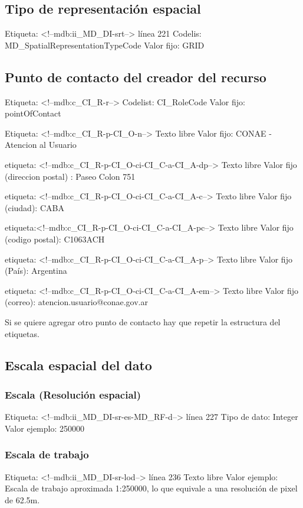 \documentclass{GVT_CONAE_Class}
\begin{document}
\subsection{Tipo de representación espacial}
Etiqueta: <!--mdb:ii\_MD\_DI-srt--> línea 221
Codelis: MD\_SpatialRepresentationTypeCode
Valor fijo: GRID

\subsection{Punto de contacto del creador del recurso}
Etiqueta: <!--mdb:c\_CI\_R-r-->
Codelist: CI\_RoleCode
Valor fijo: pointOfContact

Etiqueta: <!--mdb:c\_CI\_R-p-CI\_O-n-->
Texto libre
Valor fijo: CONAE - Atencion al Usuario

etiqueta: <!--mdb:c\_CI\_R-p-CI\_O-ci-CI\_C-a-CI\_A-dp-->
Texto libre
Valor fijo (direccion postal) : Paseo Colon 751

etiqueta: <!--mdb:c\_CI\_R-p-CI\_O-ci-CI\_C-a-CI\_A-c-->
Texto libre
Valor fijo (ciudad): CABA

etiqueta:<!--mdb:c\_CI\_R-p-CI\_O-ci-CI\_C-a-CI\_A-pc-->
Texto libre
Valor fijo (codigo postal): C1063ACH

etiqueta: <!--mdb:c\_CI\_R-p-CI\_O-ci-CI\_C-a-CI\_A-p-->
Texto libre
Valor fijo (País): Argentina

etiqueta: <!--mdb:c\_CI\_R-p-CI\_O-ci-CI\_C-a-CI\_A-em-->
Texto libre
Valor fijo (correo): atencion.usuario@conae.gov.ar

Si se quiere agregar otro punto de contacto hay que repetir la estructura del etiquetas. 

\subsection{Escala espacial del dato}
\subsubsection{Escala (Resolución espacial)}
Etiqueta: <!--mdb:ii\_MD\_DI-sr-es-MD\_RF-d--> línea 227
Tipo de dato: Integer
Valor ejemplo: 250000

\subsubsection{Escala de trabajo}
Etiqueta: <!--mdb:ii\_MD\_DI-sr-lod--> línea 236
Texto libre
Valor ejemplo: Escala de trabajo aproximada 1:250000, lo que equivale a una resolución de pixel de 62.5m.
\end{document}
